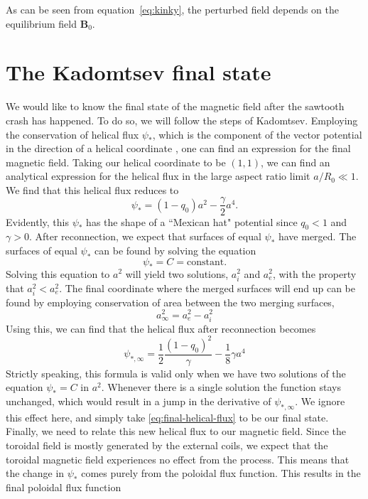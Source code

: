 \documentclass[%
superscriptaddress,
amsmath,amssymb,
aps,
pre,
floatfix,
]{revtex4-2}
\begin{document}
As can be seen from equation~\eqref{eq:kinky}, the perturbed field depends on the equilibrium field $\mathbf{B}_0$. 



\section*{The Kadomtsev final state}
We would like to know the final state of the magnetic field after the sawtooth crash has happened. To do so, we will follow the steps of Kadomtsev. Employing the conservation of helical flux $\psi_*$, which is the component of the vector potential in the direction of a helical coordinate \cite{Biskamp1997}, one can find an expression for the final magnetic field. Taking our helical coordinate to be $(1,1)$, we can find an analytical expression for the helical flux in the large aspect ratio limit $a/R_0 \ll 1$. We find that this helical flux reduces to
\begin{equation}
    \psi_{*} = (1-q_0)a^2 - \frac{\gamma}{2}a^4.
\end{equation}
Evidently, this $\psi_*$ has the shape of a ``Mexican hat" potential since $q_0<1$ and $\gamma>0$. After reconnection, we expect that surfaces of equal $\psi_*$ have merged. The surfaces of equal $\psi_*$ can be found by solving the equation
\begin{equation}
    \psi_{*} = C = \text{constant.}
\end{equation}
Solving this equation to $a^2$ will yield two solutions, $a_i^2$ and $a_e^2$, with the property that $a_i^2 < a_e^2$. The final coordinate where the merged surfaces will end up can be found by employing conservation of area between the two merging surfaces,
\begin{equation}
    a_{\infty}^2 = a_e^2 - a_i^2
\end{equation}
Using this, we can find that the helical flux after reconnection becomes
\begin{equation}
    \psi_{*,\infty} = \frac{1}{2}\frac{(1-q_0)^2}{\gamma} - \frac{1}{8} \gamma a^4
    \label{eq:final-helical-flux}
\end{equation}
Strictly speaking, this formula is valid only when we have two solutions of the equation $\psi_* = C$ in $a^2$. Whenever there is a single solution the function stays unchanged, which would result in a jump in the derivative of $\psi_{*,\infty}$. We ignore this effect here, and simply take \eqref{eq:final-helical-flux} to be our final state. Finally, we need to relate this new helical flux to our magnetic field. Since the toroidal field is mostly generated by the external coils, we expect that the toroidal magnetic field experiences no effect from the process. This means that the change in $\psi_*$ comes purely from the poloidal flux function. This results in the final poloidal flux function
\end{document}
